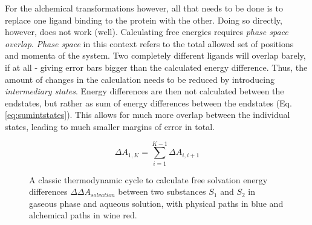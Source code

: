\documentclass[oneside]{scrreprt}
\begin{document}
For the alchemical transformations however, all that needs to be done is to replace one ligand binding to the protein with the other. Doing so directly, however, does not work (well). Calculating free energies requires \emph{phase space overlap}. \emph{Phase space} in this context refers to the total allowed set of positions and momenta of the system. Two completely different ligands will overlap barely, if at all - giving error bars bigger than the calculated energy difference. Thus, the amount of changes in the calculation needs to be reduced by introducing \emph{intermediary states}. Energy differences are then not calculated between the endstates, but rather as sum of energy differences between the endstates (Eq. \ref{eq:sumintstates}). This allows for much more overlap between the individual states, leading to much smaller margins of error in total.

\begin{equation}
    \Delta A_{1,K} = \sum^{K-1}_{i=1} \Delta A_{i,i+1}
    \label{eq:sumintstates}
\end{equation}



\begin{figure}[h]
    \centering
     



    \caption[Thermodynamic cycle for RSFE differences]{A classic thermodynamic cycle to calculate free solvation energy differences $\Delta\Delta A_{solvation}$ between two substances $S_1$ and $S_2$ in gaseous phase and aqueous solution, with physical paths in blue and alchemical paths in wine red.}
    \label{fig:thermocycle_rsfe}
\end{figure}
\end{document}
